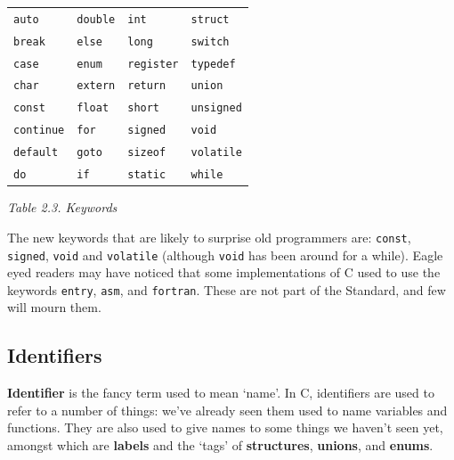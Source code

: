    \begin{tabular}{lllp{\textwidth}}
     \texttt{auto} & \texttt{double} & \texttt{int} & \texttt{struct}
    \\

     \texttt{break} & \texttt{else} & \texttt{long} & \texttt{switch}
    \\

     \texttt{case} & \texttt{enum} & \texttt{register} & \texttt{typedef}
    \\

     \texttt{char} & \texttt{extern} & \texttt{return} & \texttt{union}
    \\

     \texttt{const} & \texttt{float} & \texttt{short} & \texttt{unsigned}
    \\

     \texttt{continue} & \texttt{for} & \texttt{signed} & \texttt{void}
    \\

     \texttt{default} & \texttt{goto} & \texttt{sizeof} & \texttt{volatile}
    \\

     \texttt{do} & \texttt{if} & \texttt{static} & \texttt{while}
    \\
\end{tabular}

\begin{center}\textit{Table 2.3. Keywords}\end{center}


   The new keywords that are likely to surprise old programmers are:
    \texttt{const}, \texttt{signed}, \texttt{void} and
    \texttt{volatile} (although \texttt{void} has been around for a
    while). Eagle eyed readers may have noticed that some implementations of
    C used to use the keywords \texttt{entry}, \texttt{asm}, and
    \texttt{fortran}. These are not part of the Standard, and few will
    mourn them.


  

  \subsection{Identifiers}
   

   \textbf{Identifier} is the fancy term used to mean `name'.
    In C, identifiers are used to refer to a number of things: we've
    already seen them used to name variables and functions. They are also
    used to give names to some things we haven't seen yet, amongst which are
    \textbf{labels} and the `tags' of \textbf{structures},
    \textbf{unions}, and \textbf{enums}.


